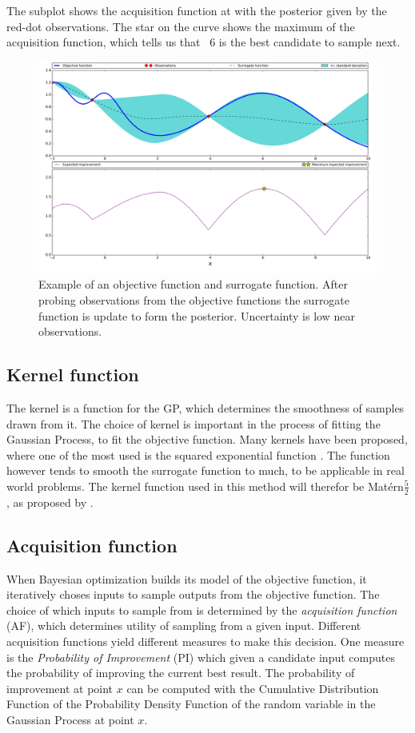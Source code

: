 The subplot shows the acquisition function at with the posterior given by the red-dot observations. The star on the curve shows the maximum of the acquisition function, which tells us that ~6 is the best candidate to sample next.
\begin{figure}%
	\centering
	\includegraphics[width=1\textwidth]{figures/BO.png}
	\vspace{-2em}
	\caption{Example of an objective function and surrogate function. After probing observations from the objective functions the surrogate function is update to form the posterior. Uncertainty is low near observations.}
	\label{fig:bayesian-optimization}
\end{figure}

\subsection{Kernel function}\label{sec:kernel-function}
The kernel is a function for the GP, which determines the smoothness of samples drawn from it. The choice of kernel is important in the process of fitting the Gaussian Process, to fit the objective function. Many kernels have been proposed, where one of the most used is the squared exponential function \citet{brochu2010tutorial}. The function however tends to smooth the surrogate function to much, to be applicable in real world problems. The kernel function used in this method will therefor be Matérn$\frac{5}{2}$, as proposed by \citet{snoek2012practical}.

\subsection{Acquisition function}\label{sec:acquisition-function}
When Bayesian optimization builds its model of the objective function, it iteratively choses inputs to sample outputs from the objective function. The choice of which inputs to sample from is determined by the \emph{acquisition function} (AF), which determines utility of sampling from a given input. Different acquisition functions yield different measures to make this decision. One measure is the \emph{Probability of Improvement} (PI) which given a candidate input computes the probability of improving the current best result. The probability of improvement at point $x$  can be computed with the Cumulative Distribution Function of the Probability Density Function of the random variable in the Gaussian Process at point $x$. 


